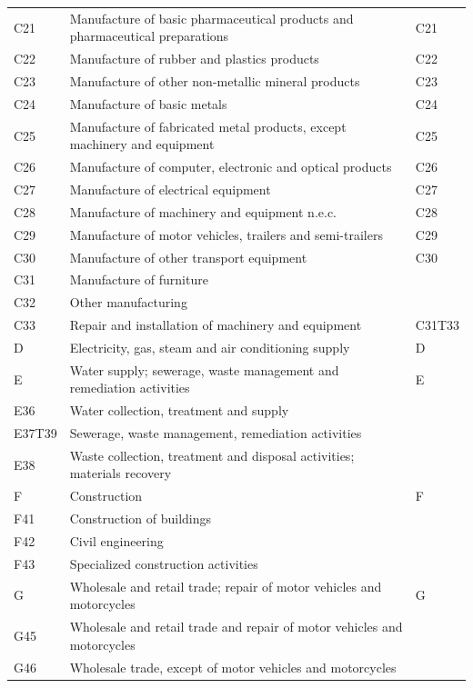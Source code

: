 \documentclass[12pt]{article}
\begin{document}
\begin{tabularx}{\textwidth}{l X l}
C21     & Manufacture of basic pharmaceutical products and pharmaceutical preparations & C21 \\
C22     & Manufacture of rubber and plastics products & C22 \\
C23     & Manufacture of other non-metallic mineral products & C23 \\
C24     & Manufacture of basic metals & C24 \\
C25     & Manufacture of fabricated metal products, except machinery and equipment & C25 \\
C26     & Manufacture of computer, electronic and optical products & C26 \\
C27     & Manufacture of electrical equipment & C27 \\
C28     & Manufacture of machinery and equipment n.e.c. & C28 \\
C29     & Manufacture of motor vehicles, trailers and semi-trailers & C29 \\
C30     & Manufacture of other transport equipment & C30 \\
C31     & Manufacture of furniture &  \\
C32     & Other manufacturing &  \\
C33     & Repair and installation of machinery and equipment & C31T33 \\
D       & Electricity, gas, steam and air conditioning supply & D \\
E       & Water supply; sewerage, waste management and remediation activities & E \\
E36     & Water collection, treatment and supply &  \\
E37T39  & Sewerage, waste management, remediation activities &  \\
E38     & Waste collection, treatment and disposal activities; materials recovery &  \\
F       & Construction & F \\
F41     & Construction of buildings &  \\
F42     & Civil engineering &  \\
F43     & Specialized construction activities &  \\
G       & Wholesale and retail trade; repair of motor vehicles and motorcycles & G \\
G45     & Wholesale and retail trade and repair of motor vehicles and motorcycles &  \\
G46     & Wholesale trade, except of motor vehicles and motorcycles &  \\

\end{tabularx}
\end{document}
